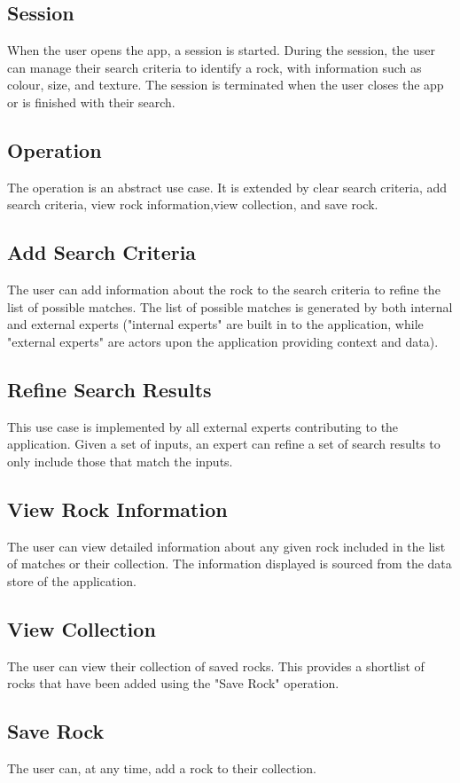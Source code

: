 \documentclass[titlepage]{article}
\begin{document}
  \subsection{Session}
    When the user opens the app, a session is started. During the session, the user can manage their search criteria to identify a rock, with information such as colour, size, and texture. The session is terminated when the user closes the app or is finished with their search.
  \subsection{Operation}
    The operation is an abstract use case. It is extended by clear search criteria, add search criteria, view rock information,view collection, and save rock.
  \subsection{Add Search Criteria}
    The user can add information about the rock to the search criteria to refine the list of possible matches. The list of possible matches is generated by both internal and external experts ("internal experts" are built in to the application, while "external experts" are actors upon the application providing context and data).
  \subsection{Refine Search Results}
    This use case is implemented by all external experts contributing to the application. Given a set of inputs, an expert can refine a set of search results to only include those that match the inputs.
  \subsection{View Rock Information}
    The user can view detailed information about any given rock included in the list of matches or their collection. The information displayed is sourced from the data store of the application.
  \subsection{View Collection}
    The user can view their collection of saved rocks. This provides a shortlist of rocks that have been added using the "Save Rock" operation. 
  \subsection{Save Rock}
    The user can, at any time, add a rock to their collection.
\end{document}
